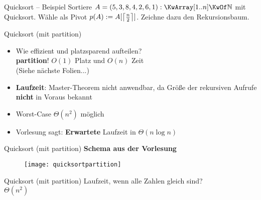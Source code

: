 \begin{frame}{Quicksort – Beispiel}
	Sortiere $A = (5,3,8,4,2,6,1): \KwArray[1..n] \KwOf \N$ mit Quicksort. Wähle als Pivot $p(A) := A[\ceil{\fract n/2 }]$. Zeichne dazu den Rekursionsbaum.
	\visible<2->{
		\begin{center}
			\texttt{[image: qstree]}
		\end{center}	
	}
\end{frame}

\begin{frame}{Quicksort (mit partition)}
	\begin{itemize}
		\item Wie effizient und platzsparend aufteilen? \\
		\impl \textbf{partition}! $O(1)$ Platz und $O(n)$ Zeit  \\
		(Siehe nächste Folien...)
		\pause
		\item \textbf{Laufzeit}: Master-Theorem nicht anwendbar, da Größe der rekursiven Aufrufe \textbf{nicht} in Voraus bekannt
		\pause
		\item Worst-Case $\Theta(n^2)$ möglich
		\pause
		\item Vorlesung sagt: \textbf{Erwartete} Laufzeit in $\Theta(n \log n)$
	\end{itemize}
\end{frame}



\begin{frame}{Quicksort (mit partition)}
	\textbf{Schema aus der Vorlesung}
	\begin{figure}[htp]
		\centering
		\texttt{[image: quicksortpartition]}
	\end{figure}
\end{frame}

\begin{frame}[t]{Quicksort (mit partition)}
	Laufzeit, wenn alle Zahlen gleich sind? \\
	\pause
	\impl $\Theta(n^2)$ \\
	\pause
\end{frame}

